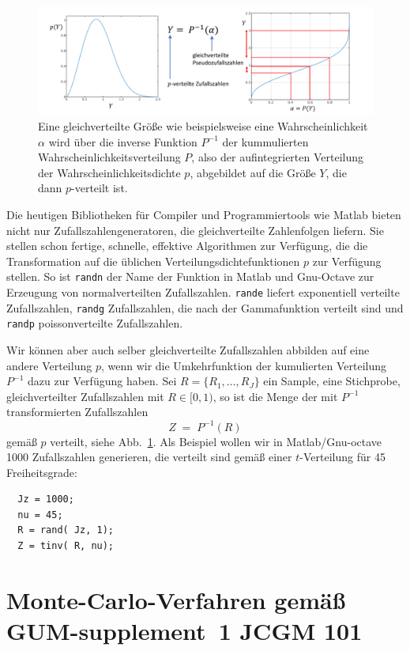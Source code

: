 \begin{figure}
\begin{center}
\includegraphics[width=160mm]{07_vorlesung/media/TransformRandomDistri.pdf}
\caption{\label{pverteilteZufallszahlen} Eine gleichverteilte Größe wie beispielsweise
eine Wahrscheinlichkeit $\alpha$ wird über die inverse Funktion $P^{-1}$ der
kummulierten Wahrscheinlichkeitsverteilung $P$, also der aufintegrierten Verteilung
der Wahrscheinlichkeitsdichte $p$, abgebildet auf die Größe $Y$, die dann $p$-verteilt ist.}
\end{center}
\end{figure}
Die heutigen Bibliotheken für Compiler und Programmiertools wie Matlab bieten nicht nur
Zufallszahlengeneratoren, die gleichverteilte Zahlenfolgen liefern. Sie stellen schon
fertige, schnelle, effektive Algorithmen zur Verfügung, die die Transformation auf die üblichen
Verteilungsdichtefunktionen $p$ zur Verfügung stellen. So ist \texttt{randn} der Name der Funktion
in Matlab und Gnu-Octave zur Erzeugung von normalverteilten Zufallszahlen. \texttt{rande}
liefert exponentiell verteilte Zufallszahlen, \texttt{randg} Zufallszahlen, die nach
der Gammafunktion verteilt sind und \texttt{randp} poissonverteilte Zufallszahlen.

Wir können aber auch selber gleichverteilte Zufallszahlen abbilden auf eine andere Verteilung $p$,
wenn wir die Umkehrfunktion der kumulierten Verteilung $P^{-1}$ dazu zur Verfügung haben.
Sei $R = \{R_1, \dots, R_J\}$ ein Sample, eine Stichprobe, gleichverteilter Zufallszahlen mit
$R \in [0,1)$, so ist die Menge der mit $P^{-1}$ transformierten Zufallszahlen
$$
Z \; = \; P^{-1}(R)
$$
gemäß $p$ verteilt, siehe Abb.~\ref{pverteilteZufallszahlen}.
Als Beispiel wollen wir in Matlab/Gnu-octave 1000 Zufalls\-zahlen generieren,
die verteilt sind gemäß einer $t$-Verteilung für 45 Freiheitsgrade:
\begin{verbatim}
  Jz = 1000;
  nu = 45;
  R = rand( Jz, 1);
  Z = tinv( R, nu);
\end{verbatim}

\section{Monte-Carlo-Verfahren gemäß GUM-supplement~1 JCGM 101}

